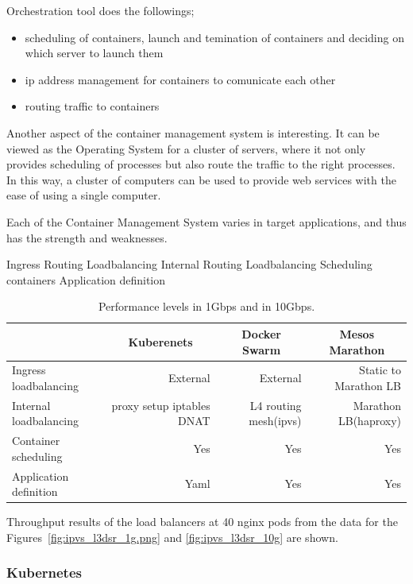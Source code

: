 Orchestration tool does the followings;

\begin{itemize}
\item scheduling of containers, launch and temination of containers and deciding on which server to launch them
\item ip address management for containers to comunicate each other
\item routing traffic to containers
\end{itemize}


Another aspect of the container management system is interesting. 
It can be viewed as the Operating System for a cluster of servers, where it not only provides scheduling of processes but also route the traffic to the right processes.
In this way, a cluster of computers can be used to provide web services with the ease of using a single computer.


Each of the Container Management System varies in target applications, and thus has the strength and weaknesses.


Ingress Routing Loadbalancing
Internal Routing Loadbalancing
Scheduling containers
Application definition

\begin{table}[H]
  \centering
  \begin{tabular}{|l|r|r|r|}
    \hline
    & \multicolumn{1}{c|}{Kuberenets} & \multicolumn{1}{c|}{Docker Swarm} & \multicolumn{1}{c|}{Mesos Marathon} \\ \hline
    Ingress loadbalancing & External & External & Static to Marathon LB  \\ \hline
    Internal loadbalancing & proxy setup iptables DNAT  & L4 routing mesh(ipvs) & Marathon LB(haproxy)  \\ \hline
    Container scheduling & Yes  & Yes & Yes  \\ \hline
    Application definition & Yaml & Yes & Yes  \\ \hline
  \end{tabular}
  \caption{Performance levels in 1Gbps and in 10Gbps.}
  \raggedright
  Throughput results of the load balancers at 40 nginx pods from the data for the Figures~\ref{fig:ipvs_l3dsr_1g.png} and \ref{fig:ipvs_l3dsr_10g} are shown.
  \label{table:aaaa}
\end{table}

\subsubsection{Kubernetes}
